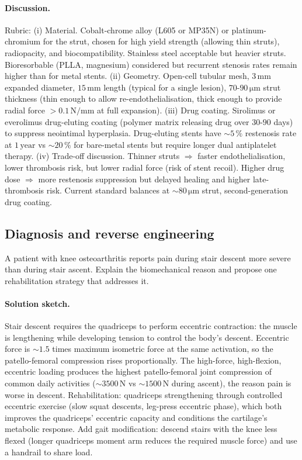 \paragraph{Discussion.}
Rubric: (i) Material. Cobalt-chrome alloy (L605 or MP35N) or
platinum-chromium for the strut, chosen for high yield strength
(allowing thin struts), radiopacity, and biocompatibility.
Stainless steel acceptable but heavier struts. Bioresorbable
(PLLA, magnesium) considered but recurrent stenosis rates remain
higher than for metal stents.
(ii) Geometry. Open-cell tubular mesh, $3\,\text{mm}$ expanded
diameter, $15\,\text{mm}$ length (typical for a single lesion),
$70$-$90\,\si{\micro\meter}$ strut thickness (thin enough to allow
re-endothelialisation, thick enough to provide radial force
$> 0.1\,\text{N/mm}$ at full expansion).
(iii) Drug coating. Sirolimus or everolimus drug-eluting coating
(polymer matrix releasing drug over $30$-$90$ days) to suppress
neointimal hyperplasia. Drug-eluting stents have $\sim 5\,\%$
restenosis rate at $1\,\text{year}$ vs $\sim 20\,\%$ for bare-metal
stents but require longer dual antiplatelet therapy.
(iv) Trade-off discussion. Thinner struts $\Rightarrow$ faster
endothelialisation, lower thrombosis risk, but lower radial force
(risk of stent recoil). Higher drug dose $\Rightarrow$ more
restenosis suppression but delayed healing and higher late-thrombosis
risk. Current standard balances at $\sim 80\,\si{\micro\meter}$
strut, second-generation drug coating.

\subsection*{Diagnosis and reverse engineering}

\begin{exercise}
A patient with knee osteoarthritis reports pain during stair
descent more severe than during stair ascent. Explain the
biomechanical reason and propose one rehabilitation strategy that
addresses it.
\end{exercise}

\paragraph{Solution sketch.}
Stair descent requires the quadriceps to perform eccentric
contraction: the muscle is lengthening while developing tension to
control the body's descent. Eccentric force is $\sim 1.5$ times
maximum isometric force at the same activation, so the
patello-femoral compression rises proportionally. The high-force,
high-flexion, eccentric loading produces the highest patello-femoral
joint compression of common daily activities ($\sim 3500\,\text{N}$
vs $\sim 1500\,\text{N}$ during ascent), the reason pain is worse
in descent. Rehabilitation: quadriceps strengthening through
controlled eccentric exercise (slow squat descents, leg-press
eccentric phase), which both improves the quadriceps' eccentric
capacity and conditions the cartilage's metabolic response. Add
gait modification: descend stairs with the knee less flexed (longer
quadriceps moment arm reduces the required muscle force) and use a
handrail to share load.

